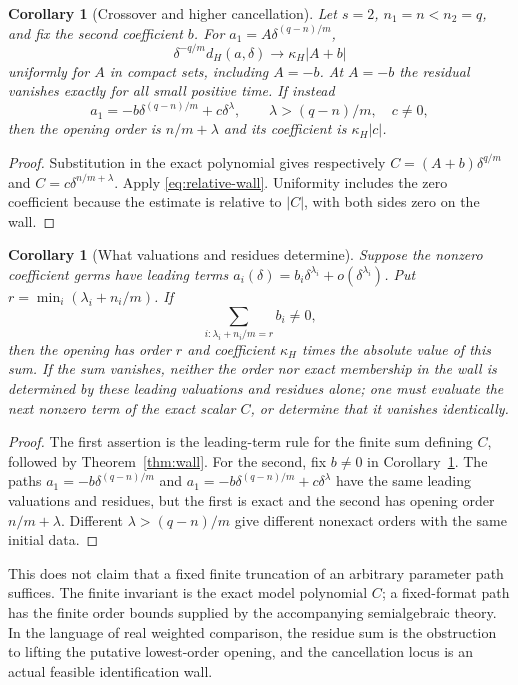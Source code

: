 \documentclass[11pt,reqno]{amsart}
\numberwithin{equation}{section}
\newtheorem{corollary}[theorem]{Corollary}
\theoremstyle{definition}
\theoremstyle{remark}
\begin{document}
\begin{corollary}[Crossover and higher cancellation]\label{cor:crossover}
Let $s=2$, $n_1=n<n_2=q$, and fix the second coefficient $b$. For $a_1=A\delta^{(q-n)/m}$,
\[
 \delta^{-q/m}d_H(a,\delta)\longrightarrow\kappa_H|A+b|
\]
uniformly for $A$ in compact sets, including $A=-b$. At $A=-b$ the residual vanishes exactly for all small positive time. If instead
\[
 a_1=-b\delta^{(q-n)/m}+c\delta^\lambda,
 \qquad \lambda>(q-n)/m,\quad c\ne0,
\]
then the opening order is $n/m+\lambda$ and its coefficient is $\kappa_H|c|$.
\end{corollary}
\begin{proof}
Substitution in the exact polynomial gives respectively $C=(A+b)\delta^{q/m}$ and $C=c\delta^{n/m+\lambda}$. Apply \eqref{eq:relative-wall}. Uniformity includes the zero coefficient because the estimate is relative to $|C|$, with both sides zero on the wall.
\end{proof}

\begin{corollary}[What valuations and residues determine]\label{cor:residue-wall}
Suppose the nonzero coefficient germs have leading terms $a_i(\delta)=b_i\delta^{\lambda_i}+o(\delta^{\lambda_i})$. Put $r=\min_i(\lambda_i+n_i/m)$. If
\[
 \sum_{i:\lambda_i+n_i/m=r}b_i\ne0,
\]
then the opening has order $r$ and coefficient $\kappa_H$ times the absolute value of this sum. If the sum vanishes, neither the order nor exact membership in the wall is determined by these leading valuations and residues alone; one must evaluate the next nonzero term of the exact scalar $C$, or determine that it vanishes identically.
\end{corollary}
\begin{proof}
The first assertion is the leading-term rule for the finite sum defining $C$, followed by Theorem~\ref{thm:wall}. For the second, fix $b\ne0$ in Corollary~\ref{cor:crossover}. The paths $a_1=-b\delta^{(q-n)/m}$ and $a_1=-b\delta^{(q-n)/m}+c\delta^\lambda$ have the same leading valuations and residues, but the first is exact and the second has opening order $n/m+\lambda$. Different $\lambda>(q-n)/m$ give different nonexact orders with the same initial data.
\end{proof}
This does not claim that a fixed finite truncation of an arbitrary parameter path suffices. The finite invariant is the exact model polynomial $C$; a fixed-format path has the finite order bounds supplied by the accompanying semialgebraic theory. In the language of real weighted comparison, the residue sum is the obstruction to lifting the putative lowest-order opening, and the cancellation locus is an actual feasible identification wall.
\end{document}
